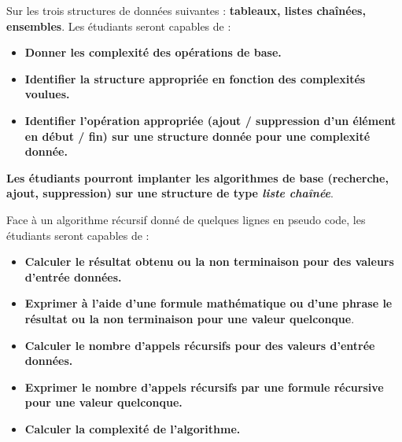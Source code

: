 \documentclass{../cours}
\begin{document}
\begin{aav}
Sur les trois structures de données suivantes : \textbf{tableaux, listes chaînées, ensembles}. Les étudiants seront capables de :
\begin{itemize}
\item \textbf{Donner les complexité des opérations de base.}
\item \textbf{Identifier la structure appropriée en fonction des complexités voulues.}
\item \textbf{Identifier l'opération appropriée (ajout / suppression d'un élément en début / fin) sur une structure donnée pour une complexité donnée.}
\end{itemize}
\end{aav}

\begin{aav}
\textbf{Les étudiants pourront implanter les algorithmes de base (recherche, ajout, suppression) sur une structure de type \emph{liste chaînée}}.
\end{aav}

\begin{aav}
Face à un algorithme récursif donné de quelques lignes en pseudo code, les étudiants seront capables de :
\begin{itemize}
\item \textbf{Calculer le résultat obtenu ou la non terminaison pour des valeurs d'entrée données.}
\item \textbf{Exprimer à l'aide d'une formule mathématique ou d'une phrase le résultat ou la non terminaison pour une valeur quelconque}.
\item \textbf{Calculer le nombre d'appels récursifs pour des valeurs d'entrée données.}
\item \textbf{Exprimer le nombre d'appels récursifs par une formule récursive pour une valeur quelconque.}
\item \textbf{Calculer la complexité de l'algorithme.}
\end{itemize}

\end{aav}
\end{document}

